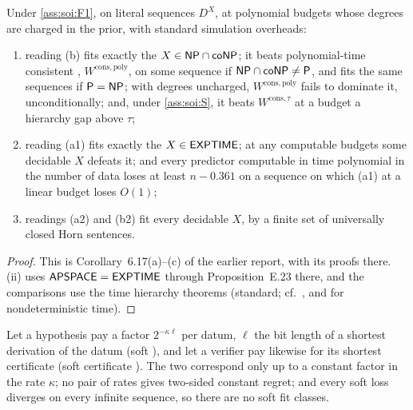 \begin{corollary}\label{cor:soi:fit}
Under \cref{ass:soi:F1}, on literal sequences $D^X$, at polynomial budgets whose degrees are charged in the prior, with standard simulation overheads:
\begin{enumerate}[label=(\roman*),leftmargin=*]
\item reading (b) fits exactly the $X\in\mathsf{NP}\cap\mathsf{coNP}$; it beats polynomial-time consistent \SOIabbr, $W^{\mathrm{cons},\mathrm{poly}}$, on some sequence if $\mathsf{NP}\cap\mathsf{coNP}\ne\mathsf{P}$, and fits the same sequences if $\mathsf{P}=\mathsf{NP}$; with degrees uncharged, $W^{\mathrm{cons},\mathrm{poly}}$ fails to dominate it, unconditionally; and, under \cref{ass:soi:S}, it beats $W^{\mathrm{cons},\tau}$ at a budget a hierarchy gap above $\tau$;
\item reading (a1) fits exactly the $X\in\mathsf{EXPTIME}$; at any computable budgets some decidable $X$ defeats it; and every predictor computable in time polynomial in the number of data loses at least $n-0.361$ on a sequence on which (a1) at a linear budget loses $O(1)$;
\item readings (a2) and (b2) fit every decidable $X$, by a finite set of universally closed Horn sentences.
\end{enumerate}
\end{corollary}

\begin{proof}
This is Corollary~6.17(a)--(c) of the earlier report, with its proofs there. (ii) uses $\mathsf{APSPACE}=\mathsf{EXPTIME}$ \citep{chandra1981alternation} through Proposition~E.23 there, and the comparisons use the time hierarchy theorems (standard; cf.\ \citealp{hartmanis1965computational}, and \citealp{seiferas1978separating} for nondeterministic time).
\end{proof}

\begin{proposition}\label{prop:soi:soft}
Let a hypothesis pay a factor $2^{-\kappa\ell}$ per datum, $\ell$ the bit length of a shortest derivation of the datum (soft \SAIabbr), and let a verifier pay likewise for its shortest certificate (soft certificate \SOIabbr). The two correspond only up to a constant factor in the rate $\kappa$; no pair of rates gives two-sided constant regret; and every soft loss diverges on every infinite sequence, so there are no soft fit classes.
\end{proposition}

